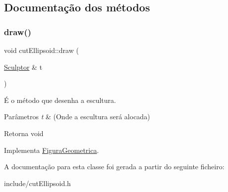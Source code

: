 \subsection{Documentação dos métodos}
\mbox{\label{classcut_ellipsoid_aa93a018312690a4f61fc13134f84bebc}} 
\subsubsection{\texorpdfstring{draw()}{draw()}}
{\footnotesize\ttfamily void cut\+Ellipsoid\+::draw (\begin{DoxyParamCaption}\item[{\hyperlink{class_sculptor}{Sculptor} \&}]{t }\end{DoxyParamCaption})\hspace{0.3cm}{\ttfamily [virtual]}}



É o método que desenha a escultura. 


\begin{DoxyParams}{Parâmetros}
{\em t} & (Onde a escultura será alocada) \\
\hline
\end{DoxyParams}
\begin{DoxyReturn}{Retorna}
void 
\end{DoxyReturn}


Implementa \hyperlink{class_figura_geometrica_a34585fd7c0bd7378fc69c4ee208e676c}{Figura\+Geometrica}.



A documentação para esta classe foi gerada a partir do seguinte ficheiro\+:\begin{DoxyCompactItemize}
\item 
include/cut\+Ellipsoid.\+h\end{DoxyCompactItemize}
